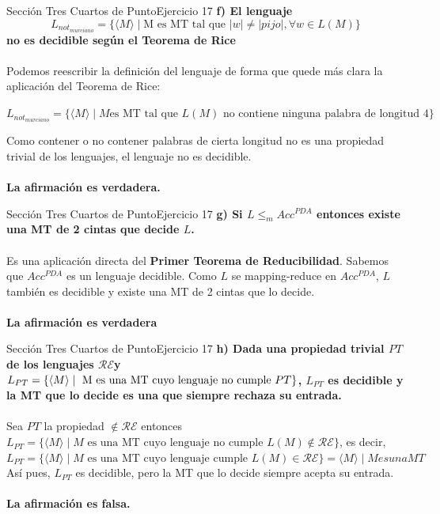 \documentclass[10pt, envcountsect, presentation, aspectratio=169]{beamer}
\newcommand{\lr}{\ensuremath{\mathcal {RE}}}
\begin{document}

\begin{frame}{Sección Tres Cuartos de Punto}{Ejercicio 17}
    \textbf{f) El lenguaje $$L_{not_{murciano}}=\{\langle M \rangle \mid \mbox{M es MT  tal que } |w|\neq |pijo|,  \forall w \in L(M) \}$$  no es decidible según el Teorema de Rice}\\~\\
    
    Podemos reescribir la definición del lenguaje de forma que quede más clara la aplicación del Teorema de Rice:
    \begin{center}
        $L_{not_{murciano}}=\{\langle M \rangle \mid M \text{es MT tal que } L(M) \text{ no contiene ninguna palabra de longitud 4}\}$
    \end{center}
    Como contener o no contener palabras de cierta longitud no es una propiedad trivial de los lenguajes, el lenguaje no es decidible.\\~\\

    \textbf{La afirmación es verdadera.}
\end{frame}


\begin{frame}{Sección Tres Cuartos de Punto}{Ejercicio 17}
    \textbf{g) Si $L\le_m  Acc^{PDA}$ entonces existe una MT de 2 cintas que decide $L$. }\\~\\
    Es una aplicación directa del \textbf{Primer Teorema de Reducibilidad}. Sabemos que $Acc^{PDA}$ es un lenguaje decidible.
    Como $L$ se mapping-reduce en $Acc^{PDA}$, $L$ también es decidible y existe una MT de 2 cintas que lo decide.\\~\\

    \textbf{La afirmación es verdadera}
\end{frame}


\begin{frame}{Sección Tres Cuartos de Punto}{Ejercicio 17}
    \textbf{h) Dada  una propiedad trivial $PT$ de los lenguajes \lr \space y $L_{PT}=\{\langle M \rangle \mid \hbox{ M es una MT cuyo lenguaje no cumple } PT\}$, $L_{PT}$ es decidible y la MT que lo decide es una que siempre rechaza su entrada.}\\~\\
   
    Sea $PT$ la propiedad $ \notin \mathcal{RE}$ entonces $L_{PT} = \{\langle M \rangle \mid M \text{ es una MT cuyo lenguaje no cumple } L(M) \notin \mathcal{RE}\}$, es decir, $L_{PT} = \{\langle M \rangle \mid M \text{ es una MT cuyo lenguaje cumple } L(M) \in \mathcal{RE}\} = {\langle M \rangle \mid M es una MT}$
    Así pues, $L_{PT}$ es decidible, pero la MT que lo decide siempre acepta su entrada.\\~\\

    \textbf{La afirmación es falsa.}
\end{frame}
\end{document}
